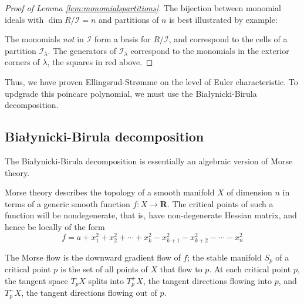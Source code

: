 \documentclass{amsart}[12pt]
\theoremstyle{definition}
\newcommand{\R}{\mathbf{R}}
\newcommand{\II}{\mathcal{I}}
\begin{document}
\begin{proof}[Proof of Lemma \ref{lem:monomialspartitions}]

The bijection between monomial ideals with $\dim R/\II=n$ and partitions of $n$ is best illustrated by example: 

\begin{center}
\end{center}

The monomials \emph{not} in $\II$ form a basis for $R/\II$, and correspond to the cells of a partition $\II_\lambda$.  The generators of $\II_\lambda$ correspond to the monomials in the exterior corners of $\lambda$, the squares in red above.

\end{proof}

Thus, we have proven Ellingsrud-Str\o mme on the level of Euler characteristic.  To updgrade this poincare polynomial, we must use the Bia\l ynicki-Birula decomposition.



\subsection{Bia\l ynicki-Birula decomposition}

The Bia\l ynicki-Birula decomposition is essentially an algebraic version of Morse theory.

Morse theory describes the topology of a smooth manifold $X$ of dimension $n$ in terms of a generic smooth function $f:X\to\R$.  The critical points of such a function will be nondegenerate, that is, have non-degenerate Hessian matrix, and hence be locally of the form
\[f=a+x_1^2+x_2^2+\cdots +x_k^2-x_{k+1}^2-x_{k+2}^2-\cdots -x_n^2\]

The Morse flow is the downward gradient flow of $f$; the stable manifold $S_p$ of a critical point $p$ is the set of all points of $X$ that flow to $p$.  At each critical point $p$, the tangent space $T_pX$ splits into $T^+_pX$, the tangent directions flowing into $p$, and $T_p^-X$, the tangent directions flowing out of $p$.
\end{document}
